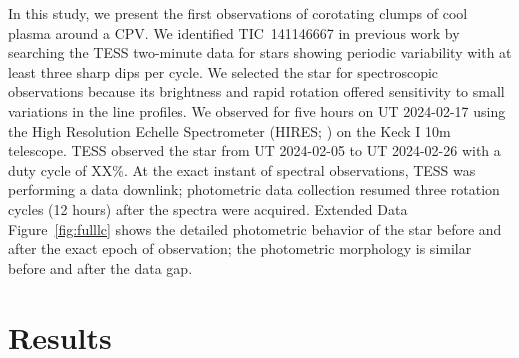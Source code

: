 \documentclass{nature3}
\begin{document}
In this study, we present the first observations of corotating clumps
of cool plasma around a CPV.  We identified TIC~141146667 in previous
work \cite{Bouma2024} by searching the TESS two-minute data for stars
showing periodic variability with at least three sharp dips per cycle.
We selected the star for spectroscopic observations because its
brightness and rapid rotation offered sensitivity to small variations
in the line profiles.  We observed for five hours on UT 2024-02-17
using the High Resolution Echelle Spectrometer (HIRES;
\cite{vogt_hires_1994}) on the Keck I 10m telescope.  TESS observed
the star from UT 2024-02-05 to UT 2024-02-26 with a duty cycle of
XX\%.  
At the exact instant of spectral observations, TESS was performing a
data downlink; photometric data collection resumed three rotation
cycles (12 hours) after the spectra were acquired.  Extended Data
Figure~\ref{fig:fulllc} shows the detailed photometric behavior of the
star before and after the exact epoch of observation; the photometric
morphology is similar before and after the data gap.


\section{Results}
\end{document}
